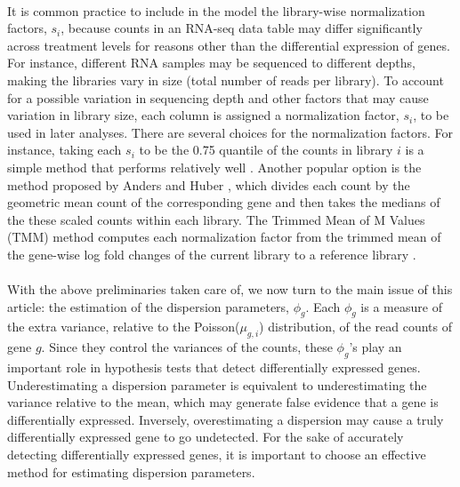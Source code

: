 \documentclass[10pt]{article}
\begin{document}
\paragraph{} \indent It is common practice to include in the model the library-wise normalization factors, $s_i$, because counts in an RNA-seq data table may differ significantly across treatment levels for reasons other than the differential expression of genes. For instance, different RNA samples may be sequenced to different depths, making the libraries vary in size (total number of reads per library). To account for a possible variation in sequencing depth and other factors that may cause variation in library size, each column is assigned a normalization factor, $s_i$, to be used in later analyses. There are several choices for the normalization factors. For instance, taking each $s_i$ to be the 0.75 quantile of the counts in library $i$ is a simple method that performs relatively well \cite{amap}. Another popular option is the method proposed by Anders and Huber \cite{deseq}, which divides each count by the geometric mean count of the corresponding gene and then takes the medians of the these scaled counts within each library. The Trimmed Mean of M Values (TMM) method computes %
each normalization factor from the trimmed mean of the gene-wise log fold changes of the current library to a reference library \cite{tmm}.




\paragraph{} \indent With the above preliminaries taken care of, we now turn to the main issue of this article: the estimation of the dispersion parameters, $\phi_{g}$. Each $\phi_{g}$ is a measure of the extra variance, relative to the Poisson($\mu_{g,i}$) distribution, of the read counts of gene $g$. Since they control the variances of the counts, these $\phi_g$'s play an important role in hypothesis tests that detect differentially expressed genes. Underestimating a dispersion parameter is equivalent to underestimating the variance relative to the mean, which may generate false evidence that a gene is differentially expressed. Inversely, overestimating a dispersion may cause a truly differentially expressed gene %
to go undetected. For the sake of accurately detecting differentially expressed genes, it is important to choose an effective method for estimating dispersion parameters.
\end{document}
